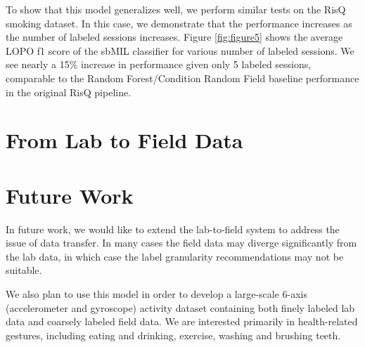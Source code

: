 \documentclass{sigchi}
\begin{document}
To show that this model generalizes well, we perform similar tests on the RisQ smoking dataset. In this case, we demonstrate that the performance increases as the number of labeled sessions increases. Figure \ref{fig:figure5} shows the average LOPO f1 score of the sbMIL classifier for various number of labeled sessions. We see nearly a 15\% increase in performance given only 5 labeled sessions, comparable to the Random Forest/Condition Random Field baseline performance in the original RisQ pipeline.

\section{From Lab to Field Data}






\section{Future Work}

In future work, we would like to extend the lab-to-field system to address the issue of data transfer. In many cases the field data may diverge significantly from the lab data, in which case the label granularity recommendations may not be suitable.

We also plan to use this model in order to develop a large-scale 6-axis (accelerometer and gyroscope) activity dataset containing both finely labeled lab data and coarsely labeled field data. We are interested primarily in health-related gestures, including eating and drinking, exercise, washing and brushing teeth.
\end{document}
